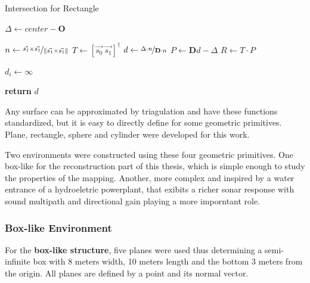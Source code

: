 \begin{algorithm}
\caption{Intersection for Rectangle}
\label{alg:rectangle}
\begin{algorithmic}

\State $\Delta \gets center -
\mathbf{O}$ 

\State $n \gets \nicefrac{\vec{s_1} \times  \vec{s_1}}{\left\lVert\vec{s_1} \times  \vec{s_1}\right\rVert}$
\State $T \gets \left[ \vec{s_0} ~ \vec{s_1} \right]^\dagger$
\State $d \gets \nicefrac{\Delta \cdot n}{\mathbf{D} \cdot n}$
\State $P \gets \mathbf{D}d - \Delta$
\State $R \gets T \cdot P$

\ForAll{$i \in \left[0,\ldots,\text{size}(d)\right)$}
\State $d_i \gets \infty$
\EndIf  
\EndFor


\State \textbf{return} $d$

\EndFunction
\end{algorithmic}
\end{algorithm}

Any surface can be approximated by triagulation and have these functions
standardized, but it is easy to directly define for some geometric primitives. Plane,
rectangle, sphere and cylinder were developed for this work.

Two environments were constructed using these four geometric primitives. One
box-like for the reconstruction part of this thesis, which is simple enough to
study the properties of the mapping. Another, more complex and inspired by a
water entrance of a hydroeletric powerplant, that exibits a richer sonar
response with sound multipath and directional gain playing a more imporntant
role.
\subsubsection{Box-like Environment}
\label{eq:boxlikenv}
For the \textbf{box-like structure}, five planes were used thus determining a
semi-infinite box with 8 meters width, 10 meters length and the bottom 3 meters
from the origin. All planes are defined by a point and its normal vector.

